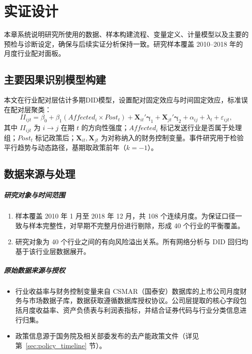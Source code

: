 \chapter{实证设计}
\label{chapter:data_method}

本章系统说明研究所使用的数据、样本构建流程、变量定义、计量模型以及主要的预检与诊断设定，确保与后续实证分析保持一致。研究样本覆盖 2010--2018 年的月度行业配对面板。

\section{主要因果识别模型构建}
\label{sec:design_model}
本文在行业配对层估计多期DID模型，设置配对固定效应与时间固定效应，标准误在配对层聚类：
\begin{equation}
\label{eq:did_baseline_ch4}
II_{ijt} = \beta_0 + \beta_1 (Affected_i \times Post_t) + \bm{X}_{it}'\bm{\gamma}_1 + \bm{X}_{jt}'\bm{\gamma}_2 + \alpha_{ij} + \lambda_t + \varepsilon_{ijt},
\end{equation}
其中 $II_{ijt}$ 为 $i\to j$ 在期 $t$ 的方向性强度；$Affected_i$ 标记发送行业是否属于处理组；$Post_t$ 标记政策后；$\bm{X}_{it},\bm{X}_{jt}$ 为对称纳入的财务控制变量。事件研究用于检验平行趋势与动态路径，基期取政策前年（$k=-1$）。

\section{数据来源与处理}
\label{sec:data_source}

\paragraph{研究对象与时间范围}
\begin{enumerate}
    \item 样本覆盖 2010 年 1 月至 2018 年 12 月，共 108 个连续月度。为保证口径一致与样本完整性，对早期不完整月份进行剔除，形成 40 个行业的平衡覆盖。
    \item 研究对象为 40 个行业之间的有向风险溢出关系。所有网络分析与 DID 回归均基于该行业层数据展开。
\end{enumerate}

\paragraph{原始数据来源与授权}
\begin{itemize}
    \item 行业收益率与财务控制变量来自 CSMAR（国泰安）数据库的上市公司月度财务与市场数据子库，数据获取遵循数据库授权协议。公司层提取的核心字段包括月度收益率、资产负债表与利润表指标，并结合证券代码与行业分类信息进行归集。
    \item 政策信息源于国务院及相关部委发布的去产能政策文件（详见第~\ref{sec:policy_timeline} 节）。
\end{itemize}

